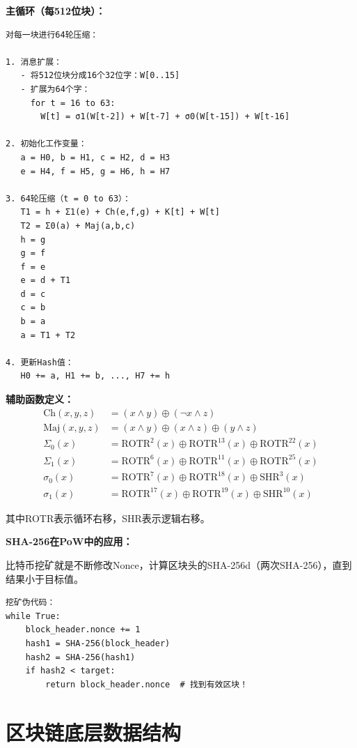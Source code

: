 ﻿\documentclass[12pt,a4paper]{article}
\begin{document}
\textbf{主循环（每512位块）：}

\begin{lstlisting}
对每一块进行64轮压缩：

1. 消息扩展：
   - 将512位块分成16个32位字：W[0..15]
   - 扩展为64个字：
     for t = 16 to 63:
       W[t] = σ1(W[t-2]) + W[t-7] + σ0(W[t-15]) + W[t-16]

2. 初始化工作变量：
   a = H0, b = H1, c = H2, d = H3
   e = H4, f = H5, g = H6, h = H7

3. 64轮压缩（t = 0 to 63）：
   T1 = h + Σ1(e) + Ch(e,f,g) + K[t] + W[t]
   T2 = Σ0(a) + Maj(a,b,c)
   h = g
   g = f
   f = e
   e = d + T1
   d = c
   c = b
   b = a
   a = T1 + T2

4. 更新Hash值：
   H0 += a, H1 += b, ..., H7 += h
\end{lstlisting}

\textbf{辅助函数定义：}
\begin{align*}
\text{Ch}(x,y,z) &= (x \land y) \oplus (\neg x \land z) \\
\text{Maj}(x,y,z) &= (x \land y) \oplus (x \land z) \oplus (y \land z) \\
\Sigma_0(x) &= \text{ROTR}^2(x) \oplus \text{ROTR}^{13}(x) \oplus \text{ROTR}^{22}(x) \\
\Sigma_1(x) &= \text{ROTR}^6(x) \oplus \text{ROTR}^{11}(x) \oplus \text{ROTR}^{25}(x) \\
\sigma_0(x) &= \text{ROTR}^7(x) \oplus \text{ROTR}^{18}(x) \oplus \text{SHR}^3(x) \\
\sigma_1(x) &= \text{ROTR}^{17}(x) \oplus \text{ROTR}^{19}(x) \oplus \text{SHR}^{10}(x)
\end{align*}

其中ROTR表示循环右移，SHR表示逻辑右移。

\begin{keypointbox}
\textbf{SHA-256在PoW中的应用：}

比特币挖矿就是不断修改Nonce，计算区块头的SHA-256d（两次SHA-256），直到结果小于目标值。

\begin{lstlisting}
挖矿伪代码：
while True:
    block_header.nonce += 1
    hash1 = SHA-256(block_header)
    hash2 = SHA-256(hash1)
    if hash2 < target:
        return block_header.nonce  # 找到有效区块！
\end{lstlisting}
\end{keypointbox}

\section{区块链底层数据结构}
\end{document}
